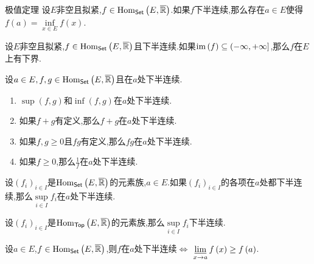 \begin{theorem}{极值定理}{}
	设$E$非空且拟紧,$f\in\operatorname{Hom}_{\mathsf{Set}}\left(E,\overline{\mathbb{R}}\right)$.如果$f$下半连续,那么存在$a\in E$使得$f\left(a\right)=\inf\limits_{x\in E}f\left(x\right)$.
\end{theorem}

\begin{corollary}{}{}
	设$E$非空且拟紧,$f\in\operatorname{Hom}_{\mathsf{Set}}\left(E,\overline{\mathbb{R}}\right)$且下半连续.如果$\operatorname{im}\left(f\right)\subseteq\left(-\infty,+\infty\right]$,那么$f$在$E$上有下界.
\end{corollary}

\begin{proposition}{}{}
	设$a\in E,f,g\in\operatorname{Hom}_{\mathsf{Set}}\left(E,\overline{\mathbb{R}}\right)$且在$a$处下半连续.
	\begin{enumerate}
		\item $\sup\left(f,g\right)$和$\inf\left(f,g\right)$在$a$处下半连续.
		\item 如果$f+g$有定义,那么$f+g$在$a$处下半连续.
		\item 如果$f,g\geq 0$且$fg$有定义,那么$fg$在$a$处下半连续.
		\item 如果$f\geq 0$,那么$\frac{1}{f}$在$a$处下半连续.
	\end{enumerate}
\end{proposition}

\begin{theorem}{}{}
	设$\left(f_{i}\right)_{i\in I}$是$\operatorname{Hom}_{\mathsf{Set}}\left(E,\overline{\mathbb{R}}\right)$的元素族,$a\in E$.如果$\left(f_{i}\right)_{i\in I}$的各项在$a$处都下半连续,那么$\sup\limits_{i\in I}f_{i}$在$a$处下半连续.
\end{theorem}

\begin{corollary}{}{}
	设$\left(f_{i}\right)_{i\in I}$是$\operatorname{Hom}_{\mathsf{Top}}\left(E,\overline{\mathbb{R}}\right)$的元素族,那么$\sup\limits_{i\in I}f_{i}$下半连续.
\end{corollary}

\begin{proposition}{}{}
	设$a\in E$,$f\in\operatorname{Hom}_{\mathsf{Set}}\left(E,\overline{\mathbb{R}}\right)$,则$f$在$a$处下半连续$\iff$ $\varliminf\limits_{x\to a}f\left(x\right)\geq f\left(a\right)$.
\end{proposition}

